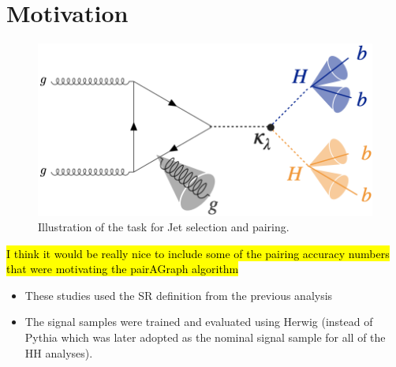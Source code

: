 \section{Motivation}

\begin{figure}[hbt]
\includegraphics[width=.8\textwidth]{figures/pairAGraph/pag-motivation}
\caption{Illustration of the task for Jet selection and pairing.}
\label{fig:pag-motivation}
\end{figure}

\hl{I think it would be really nice to include some of the pairing accuracy numbers that were motivating the pairAGraph algorithm}

\begin{itemize}
\item These studies used the SR definition from the previous analysis 
\item The signal samples were trained and evaluated using Herwig (instead of Pythia which was later adopted as the nominal signal sample for all of the HH analyses).
\end{itemize}